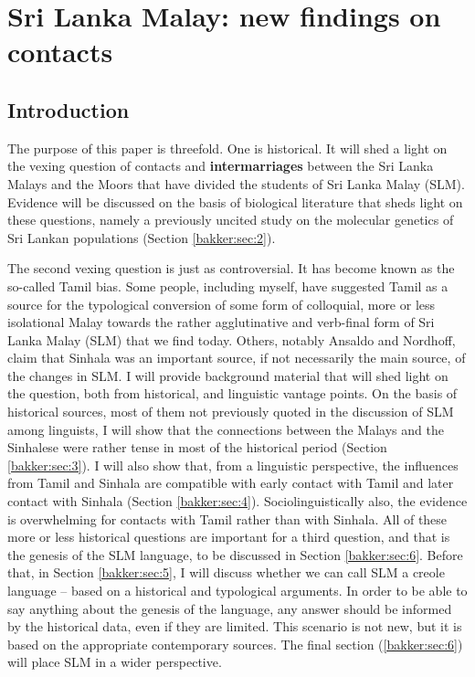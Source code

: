 \chapter{Sri Lanka Malay: new findings on contacts}


\section{Introduction}\label{bakker:sec:1}

The purpose of this paper is threefold. One is historical. It will shed a light on the vexing question of contacts and \textbf{intermarriages} between the Sri Lanka Malays and the Moors that have divided the students of Sri Lanka Malay (SLM). Evidence will be discussed on the basis of biological literature that sheds light on these questions, namely a previously uncited study on the molecular genetics of Sri Lankan populations (Section \ref{bakker:sec:2}).

The second vexing question is just as controversial. It has become known as the so-called Tamil bias. Some people, including myself, have suggested Tamil as a source for the typological conversion of some form of colloquial, more or less isolational Malay towards the rather agglutinative and verb-final form of Sri Lanka Malay (SLM) that we find today. Others, notably Ansaldo and Nordhoff, claim that Sinhala was an important source, if not necessarily the main source, of the changes in SLM. I will provide background material that will shed light on the question, both from historical, and linguistic vantage points. On the basis of historical sources, most of them not previously quoted in the discussion of SLM among linguists, I will show that the connections between the Malays and the Sinhalese were rather tense in most of the historical period (Section \ref{bakker:sec:3}). I will also show that, from a linguistic perspective, the influences from Tamil and Sinhala are compatible with early contact with Tamil and later contact with Sinhala (Section \ref{bakker:sec:4}). Sociolinguistically also, the evidence is overwhelming for contacts with Tamil rather than with Sinhala. All of these more or less historical questions are important for a third question, and that is the genesis of the SLM language, to be discussed in Section \ref{bakker:sec:6}. Before that, in Section \ref{bakker:sec:5}, I will discuss whether we can call SLM a creole language  – based on a historical and typological arguments. In order to be able to say anything about the genesis of the language, any answer should be informed by the historical data, even if they are limited. This scenario is not new, but it is based on the appropriate contemporary sources. The final section (\ref{bakker:sec:6}) will place SLM in a wider perspective.
   

